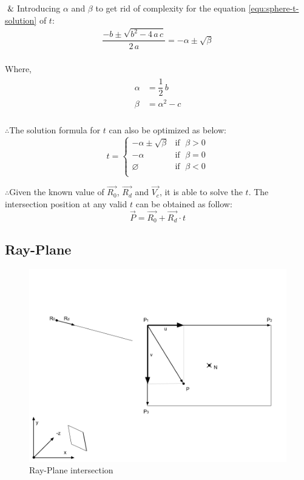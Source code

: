 $\And$\;\;\;\;Introducing $\alpha$ and $\beta$ to get rid of complexity for the equation \ref{equ:sphere-t-solution} of $t$:
\[
\begin{array}{lr}
\dfrac{-b \pm \sqrt{b^2 - 4\,a\,c}}{2\,a} = -\alpha \pm \sqrt{\beta}\\
\end{array}
\]

Where,
\[
\begin{array}{lr}
\begin{aligned}
\alpha &= \dfrac{1}{2}\,b\\
\beta &= \alpha^2 - c\\
\end{aligned}
\end{array}
\]

$\therefore$\;\;\;\;The solution formula for $t$ can also be optimized as below:
\[
t =
\begin{cases}
 -\alpha \pm \sqrt{\beta} & \text{if }\;\beta > 0\\
-\alpha & \text{if }\;\beta = 0\\
\varnothing & \text{if }\;\beta < 0\\
\end{cases}
\]

$\therefore$\;\;\;\;Given the known value of $\overrightarrow{R_0}$, $\overrightarrow{R_d}$ and $\overrightarrow{V_c}$, it is able to solve the $t$. The intersection position at any valid $t$ can be obtained as follow:
\[
\overrightarrow{P} = \overrightarrow{R_0} + \overrightarrow{R_d} \cdot t
\]

\subsection{Ray-Plane}

\begin{figure}[H]
\caption{Ray-Plane intersection}
\label{fig:ray-plane}
\centering
\includegraphics[width=\textwidth, keepaspectratio]{Figures/ray-plane-intersection.png}
\decoRule
\end{figure}

